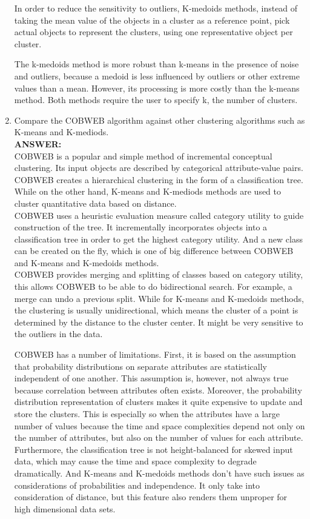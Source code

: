 \documentclass{article}
\begin{document}
\begin{enumerate}
In order to reduce the sensitivity to outliers, K-medoids methods,
instead of taking the mean value of the objects in a cluster as a
reference point, pick actual objects to represent the clusters, using
one representative object per cluster.

The k-medoids method is more robust than k-means in the presence of
noise and outliers, because a medoid is less influenced by outliers or
other extreme values than a mean. However, its processing is more
costly than the k-means method. Both methods require the user to
specify k, the number of clusters.


\item Compare the COBWEB algorithm against other clustering algorithms
  such as K-means and K-mediods. \\
\textbf{ANSWER:} \\
COBWEB is a popular and simple method of incremental conceptual
clustering. Its input objects are described by categorical
attribute-value pairs. COBWEB creates a hierarchical clustering in
the form of a classification tree. While on the other hand, K-means
and K-mediods methods are used to cluster quantitative data based on
distance. \\ 
COBWEB uses a heuristic evaluation measure called category utility
to guide construction of the tree. It incrementally incorporates
objects into a classification tree in order to get the highest category
utility. And a new class can be created on the fly, which is one of
big difference between COBWEB and K-means and K-medoids methods. \\
COBWEB provides merging and splitting of classes based on category
utility, this allows COBWEB to be able to do bidirectional search. For
example, a merge can undo a previous split. While for K-means and
K-medoids methods, the clustering is usually unidirectional, which
means the cluster of a point is determined by the distance to the
cluster center. It might be very sensitive to the outliers in the
data. 

COBWEB has a number of limitations. First, it is based on the
assumption that probability distributions on separate attributes are
statistically independent of one another. This assumption is,
however, not always true because correlation between attributes often
exists. Moreover, the probability distribution representation of
clusters makes it quite expensive to update and store the
clusters. This is especially so when the attributes have a large
number of values because the time and space complexities depend not
only on the number of attributes, but also on the number of values for
each attribute. Furthermore, the classification tree is not
height-balanced for skewed input data, which may cause the time and
space complexity to degrade dramatically. And K-means and K-medoids
methods don't have such issues as considerations of probabilities and
independence. It only take into consideration of distance, but this
feature also renders them unproper for high dimensional data sets. 


\end{enumerate}
\end{document}
